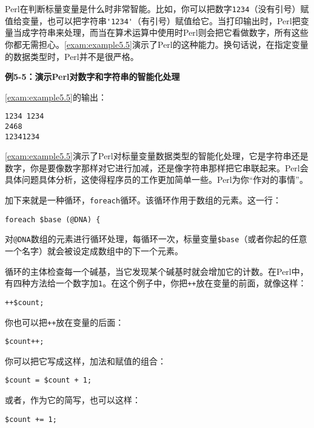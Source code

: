 Perl在判断标量变量是什么时非常智能。比如，你可以把数字\verb|1234|（没有引号）赋值给变量，也可以把字符串\verb|'1234'|（有引号）赋值给它。当打印输出时，Perl把变量当成字符串来处理，而当在算术运算中使用时Perl则会把它看做数字，所有这些你都无需担心。\autoref{exam:example5.5}演示了Perl的这种能力。换句话说，在指定变量的数据类型时，Perl并不是很严格。

\textbf{例5-5：演示Perl对数字和字符串的智能化处理}


\autoref{exam:example5.5}的输出：

\begin{lstlisting}
1234 1234
2468
12341234
\end{lstlisting}

\autoref{exam:example5.5}演示了Perl对标量变量数据类型的智能化处理，它是字符串还是数字，你是要像数字那样对它进行加减，还是像字符串那样把它串联起来。Perl会具体问题具体分析，这使得程序员的工作更加简单一些。Perl为你“作对的事情”。

加下来就是一种循环，\verb|foreach|循环。该循环作用于数组的元素。这一行：

\begin{lstlisting}
foreach $base (@DNA) {
\end{lstlisting}

对\verb|@DNA|数组的元素进行循环处理，每循环一次，标量变量\verb|$base|（或者你起的任意一个名字）就会被设定成数组中的下一个元素。

循环的主体检查每一个碱基，当它发现某个碱基时就会增加它的计数。在Perl中，有四种方法给一个数字加\verb|1|。在这个例子中，你把\verb|++|放在变量的前面，就像这样：

\begin{lstlisting}
++$count; 
\end{lstlisting}

你也可以把\verb|++|放在变量的后面：

\begin{lstlisting}
$count++;
\end{lstlisting}

你可以把它写成这样，加法和赋值的组合：

\begin{lstlisting}
$count = $count + 1;
\end{lstlisting}

或者，作为它的简写，也可以这样：

\begin{lstlisting}
$count += 1;
\end{lstlisting}

